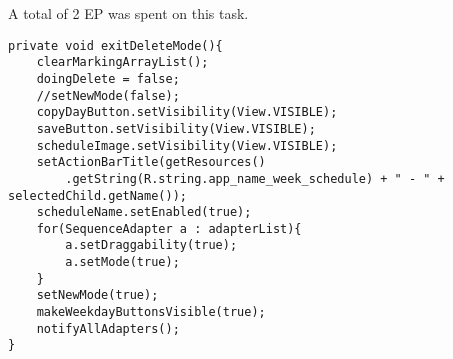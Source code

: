 A total of 2 EP was spent on this task. 

\begin{lstlisting}[caption={The \texttt{exitDeleteMode()} function, which returns the application to the default mode}, label={lst:exitdeletemode}]
private void exitDeleteMode(){
    clearMarkingArrayList();
    doingDelete = false;
    //setNewMode(false);
    copyDayButton.setVisibility(View.VISIBLE);
    saveButton.setVisibility(View.VISIBLE);
    scheduleImage.setVisibility(View.VISIBLE);
    setActionBarTitle(getResources()
        .getString(R.string.app_name_week_schedule) + " - " + selectedChild.getName());
    scheduleName.setEnabled(true);
    for(SequenceAdapter a : adapterList){
        a.setDraggability(true);
        a.setMode(true);
    }
    setNewMode(true);
    makeWeekdayButtonsVisible(true);
    notifyAllAdapters();
}
\end{lstlisting}
